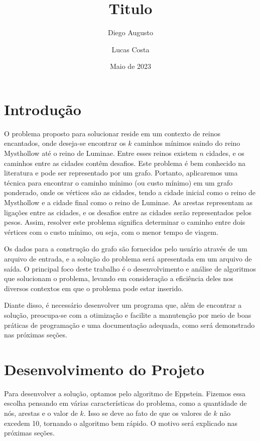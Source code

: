 \documentclass[12pt]{article}
\title{Titulo}
\date{Maio de 2023}
\author{Diego Augusto \and Lucas Costa}
\begin{document}

    \maketitle
    \newpage
    \section{Introdução}
    O problema proposto para solucionar reside em um contexto de reinos
    encantados, onde deseja-se encontrar os $k$ caminhos mínimos saindo do reino Mysthollow até o reino de Luminae. Entre esses
    reinos existem $n$ cidades, e os caminhos entre as cidades contêm desafios. Este
    problema é bem conhecido na literatura e pode ser representado por um grafo.
    Portanto, aplicaremos uma técnica para encontrar o caminho mínimo (ou custo
    mínimo) em um grafo ponderado, onde os vértices são as cidades, tendo a
    cidade inicial como o reino de Mysthollow e a cidade final como o reino de
    Luminae. As arestas representam as ligações entre as cidades, e os desafios
    entre as cidades serão representados pelos pesos. Assim, resolver este
    problema significa determinar o caminho entre dois vértices com o custo
    mínimo, ou seja, com o menor tempo de viagem.

    Os dados para a construção do grafo são fornecidos pelo usuário através de um
    arquivo de entrada, e a solução do problema será apresentada em um arquivo de
    saída. O principal foco deste trabalho é o desenvolvimento e análise de
    algoritmos que solucionam o problema, levando em consideração a eficiência deles
    nos diversos contextos em que o problema pode estar inserido. 

    Diante disso, é necessário desenvolver um programa que, além de encontrar a
    solução, preocupa-se com a otimização e facilite a manutenção por meio de boas
    práticas de programação e uma documentação adequada, como será demonstrado nas
    próximas seções.

    \newpage

    \section{Desenvolvimento do Projeto}
    Para desenvolver a solução, optamos pelo algoritmo de Eppstein. Fizemos essa
    escolha pensando em várias características do problema, como a quantidade de
    nós, arestas e o valor de $k$. Isso se deve ao fato de que os valores de $k$
    não excedem 10, tornando o algoritmo bem rápido. O motivo será explicado nas
    próximas seções.
\end{document}
